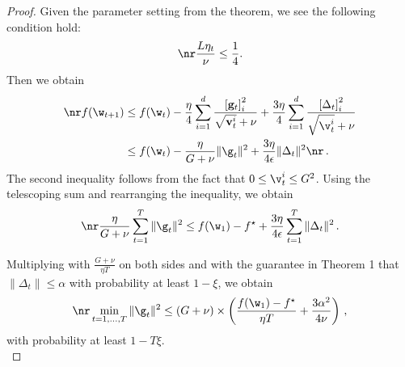 \begin{proof}
Given the parameter setting from the theorem, we see the following condition hold:
\begin{equation} \nr
    \frac{L\eta_t}{\nu} \leq \frac{1}{4}.
\end{equation}
Then we obtain
\begin{align} 
\nr f(\w_{t+1})& \leq f(\w_t) - \frac{\eta}{4} \sum_{i=1}^{d} \frac{\left[\mathbf{g}_{t}\right]_{i}^{2}}{\sqrt{\mathbf{v}_{t}^{i}}+\nu}+\frac{3 \eta}{4} \sum_{i=1}^{d} \frac{\left[\Delta_{t}\right]_{i}^{2}}{\sqrt{\v_t^i} + \nu} \\ 
& \leq f(\w_t) - \frac{\eta}{G + \nu} \|\g_t\|^2 + \frac{3\eta}{4\epsilon} \|\Delta_t\|^2 \nr  \, .
\end{align}
The second inequality follows from the fact that $0 \leq \v_t^i \leq G^2$. Using the telescoping sum and rearranging the inequality,  we obtain
\begin{align} \nr
\frac{\eta}{G + \nu} \sum_{t=1}^T \|\g_t\|^2  \leq f(\w_1) - f^\star + \frac{3\eta}{4\epsilon} \sum_{t=1}^T  \|\Delta_t\|^2  \, .
\end{align}

Multiplying with $\frac{G +\nu}{\eta T}$ on both sides and with the guarantee in Theorem 1 that $\|\Delta_t\| \leq \alpha$ with probability at least $1-\xi$,  we obtain 
\begin{equation} \nr
\min_{t = 1,..., T}\|\g_t\|^2 \leq \left(G+\nu \right) \times \left(   \frac{ f(\w_1) - f^\star}{\eta T} + \frac{3 \alpha^2}{4\nu}\right)  \, ,
\end{equation}
with probability at least $1-T\xi$.\\


\end{proof}

\vspace{0.1in}

